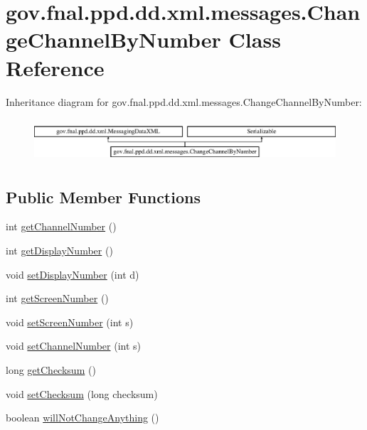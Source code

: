\hypertarget{classgov_1_1fnal_1_1ppd_1_1dd_1_1xml_1_1messages_1_1ChangeChannelByNumber}{\section{gov.\-fnal.\-ppd.\-dd.\-xml.\-messages.\-Change\-Channel\-By\-Number Class Reference}
\label{classgov_1_1fnal_1_1ppd_1_1dd_1_1xml_1_1messages_1_1ChangeChannelByNumber}
}
Inheritance diagram for gov.\-fnal.\-ppd.\-dd.\-xml.\-messages.\-Change\-Channel\-By\-Number\-:\begin{figure}[H]
\begin{center}
\leavevmode
\includegraphics[height=1.627907cm]{classgov_1_1fnal_1_1ppd_1_1dd_1_1xml_1_1messages_1_1ChangeChannelByNumber}
\end{center}
\end{figure}
\subsection*{Public Member Functions}
\begin{DoxyCompactItemize}
\item 
int \hyperlink{classgov_1_1fnal_1_1ppd_1_1dd_1_1xml_1_1messages_1_1ChangeChannelByNumber_af74449348f1fb361be4fcd3566573230}{get\-Channel\-Number} ()
\item 
int \hyperlink{classgov_1_1fnal_1_1ppd_1_1dd_1_1xml_1_1messages_1_1ChangeChannelByNumber_a2c033a785046118945e409bdc56975ce}{get\-Display\-Number} ()
\item 
void \hyperlink{classgov_1_1fnal_1_1ppd_1_1dd_1_1xml_1_1messages_1_1ChangeChannelByNumber_a86819f81f2fd9753f2664f46c9cfbdce}{set\-Display\-Number} (int d)
\item 
int \hyperlink{classgov_1_1fnal_1_1ppd_1_1dd_1_1xml_1_1messages_1_1ChangeChannelByNumber_ac27ca6c1d8ce8ae39515028484fa06be}{get\-Screen\-Number} ()
\item 
void \hyperlink{classgov_1_1fnal_1_1ppd_1_1dd_1_1xml_1_1messages_1_1ChangeChannelByNumber_ac51713709b019359af692fe9d01c9660}{set\-Screen\-Number} (int s)
\item 
void \hyperlink{classgov_1_1fnal_1_1ppd_1_1dd_1_1xml_1_1messages_1_1ChangeChannelByNumber_a014ef012680ca0b16462a77289332fcb}{set\-Channel\-Number} (int s)
\item 
long \hyperlink{classgov_1_1fnal_1_1ppd_1_1dd_1_1xml_1_1messages_1_1ChangeChannelByNumber_a8c69428da11c1a2908abf2171a468864}{get\-Checksum} ()
\item 
void \hyperlink{classgov_1_1fnal_1_1ppd_1_1dd_1_1xml_1_1messages_1_1ChangeChannelByNumber_a9e2557a6994603e976860a415d0abb7f}{set\-Checksum} (long checksum)
\item 
boolean \hyperlink{classgov_1_1fnal_1_1ppd_1_1dd_1_1xml_1_1messages_1_1ChangeChannelByNumber_a46ff1bf15e4419fcce75c63a743a5fb8}{will\-Not\-Change\-Anything} ()
\end{DoxyCompactItemize}
